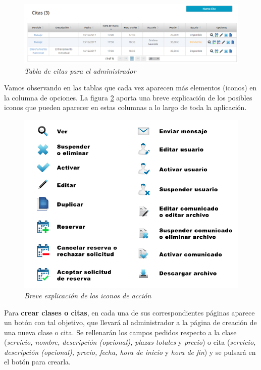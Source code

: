 \begin{figure}
\centering
  \includegraphics[scale=.35]{img/manual/tabla-citas-admin.jpg}
  \caption{\textit{Tabla de citas para el administrador}}
  \label{fig:tabla-citas-admin}
\end{figure}

Vamos observando en las tablas que cada vez aparecen más elementos (iconos) en la columna de opciones. La figura \ref{fig:explicacion-iconos} aporta una breve explicación de los posibles iconos que pueden aparecer en estas columnas a lo largo de toda la aplicación. \\

\begin{figure}
\centering
  \includegraphics[scale=.50]{img/manual/explicacion-iconos.jpg}
  \caption{\textit{Breve explicación de los iconos de acción}}
  \label{fig:explicacion-iconos}
\end{figure}

Para \textbf{crear clases o citas}, en cada una de sus correspondientes páginas aparece un botón con tal objetivo, que llevará al administrador a la página de creación de una nueva clase o cita. Se rellenarán los campos pedidos respecto a la clase (\textit{servicio, nombre, descripción (opcional), plazas totales} y \textit{precio}) o cita (\textit{servicio, descripción (opcional), precio, fecha, hora de inicio} y \textit{hora de fin}) y se pulsará en el botón para crearla. \\

